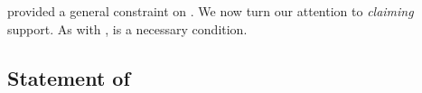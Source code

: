 
\section{}
\label{sec:ideaCS}

\begin{note}
  \ideaS{} provided a general constraint on \support{}.
  We now turn our attention to \emph{claiming} support.
  As with \ideaS{}, \ideaCS{} is a necessary condition.
\end{note}

\subsection{Statement of \ideaCS{}}
\label{sec:ideaCS:statement}

